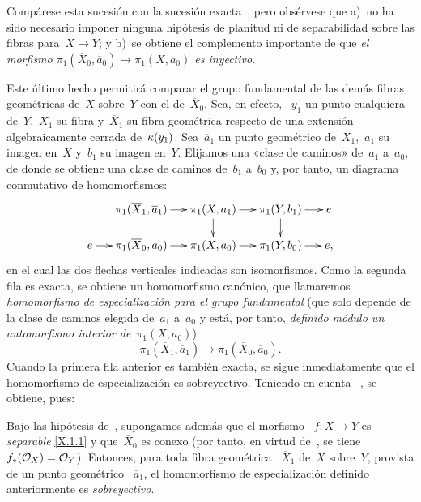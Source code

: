 Compárese esta sucesión con la sucesión exacta~, pero obsérvese que
a)~no ha sido necesario imponer ninguna hipótesis de planitud ni de
separabilidad sobre las fibras para~$X\to Y$; y b)~se obtiene el complemento
importante de que \emph{el morfismo
$\pi_1(\overline X_0,\overline a_0)\to\pi_1(X,a_0)$ es inyectivo}.

Este último hecho permitirá comparar el grupo fundamental de las demás
fibras geométricas de~$X$ sobre~$Y$ con el de~$\overline X_0$. Sea, en efecto,
~$y_1$ un punto cualquiera de~$Y$,~$X_1$ su fibra y~$\overline X_1$ su fibra
geométrica respecto de una extensión algebraicamente cerrada de~$\kres(y_1)$.
Sea~$\overline a_1$ un punto geométrico de~$\overline X_1$,~$a_1$ su imagen
en~$X$ y~$b_1$ su imagen en~$Y$. Elijamos una «clase de caminos» de~$a_1$
a~$a_0$, de donde se obtiene una clase de caminos de~$b_1$ a~$b_0$ y, por
tanto, un diagrama conmutativo de homomorfismos:
$$
\xymatrix@=.5cm{
&\pi_1(\overline X_1,\overline a_1) \ar[r] & \pi_1(X,a_1) \ar[r]\ar[d] & \pi_1(Y,b_1) \ar[r]\ar[d] & e \\
e \ar[r]& \pi_1(\overline X_0,\overline a_0) \ar[r] & \pi_1(X,a_0) \ar[r] &\pi_1(Y,b_0) \ar[r] & e,
}
$$
en el cual las dos flechas verticales indicadas son isomorfismos. Como la
segunda fila es exacta, se obtiene un homomorfismo canónico, que llamaremos
\emph{homomorfismo de especialización para el grupo fundamental} (que solo
depende de la clase de caminos elegida de~$a_1$ a~$a_0$ y está, por tanto,
\emph{definido módulo un automorfismo interior de}~$\pi_1(X,a_0)$):
$$
\pi_1(\overline X_1,\overline a_1)\to
\pi_1(\overline X_0,\overline a_0).
$$
Cuando la primera fila anterior es también exacta, se sigue inmediatamente que
el homomorfismo de especialización es sobreyectivo. Teniendo en cuenta
~, se obtiene, pues:

\begin{corollaire}
\label{X.2.3}
Bajo las hipótesis de~, supongamos además que el morfismo
~$f\colon X\to Y$ es \emph{separable} \eqref{X.1.1} y que~$\overline X_0$ es
conexo (por tanto, en virtud de~, se tiene
$f_*(\cal{O}_X)=\cal{O}_Y$). Entonces, para toda fibra geométrica
~$\overline X_1$ de~$X$ sobre~$Y$, provista de un punto geométrico
~$\overline a_1$, el homomorfismo de especialización
%
%
definido anteriormente es \emph{sobreyectivo}.
\end{corollaire}

